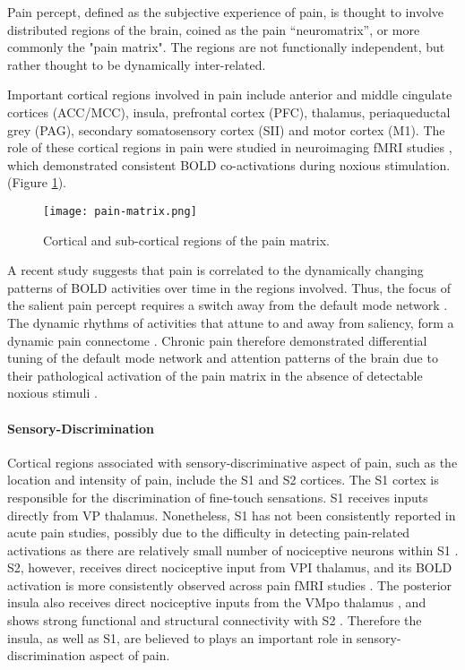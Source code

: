 Pain percept, defined as the subjective experience of pain, is thought to involve distributed regions of the brain, coined as the pain “neuromatrix”\cite{Melzack1999a}, or more commonly the "pain matrix". The regions are not functionally independent, but rather thought to be dynamically inter-related. 

 Important cortical regions involved in pain include anterior and middle cingulate cortices (ACC/MCC), insula, prefrontal cortex (PFC), thalamus, periaqueductal grey (PAG), secondary somatosensory cortex (SII) and motor cortex (M1). The role of these cortical regions in pain were studied in neuroimaging fMRI studies \cite{Apkarian2013c,Wager2013,Davis2012a}, which demonstrated consistent BOLD co-activations during noxious stimulation. (Figure \ref{fig:pain-matrix}).

 \begin{figure}[ht]
 \texttt{[image: pain-matrix.png]}
 \centering
 \caption{ Cortical and sub-cortical regions of the pain matrix. \protect\cite{Tracey2007a}} 
 \label{fig:pain-matrix}
 \end{figure}
 
A recent study suggests that pain is correlated to the dynamically changing patterns of BOLD activities over time in the regions involved. Thus, the focus of the salient pain percept requires a switch away from the default mode network \cite{Kucyi2013}. The dynamic rhythms of activities that attune to and away from saliency, form a dynamic pain connectome \cite{Kucyi2015}. Chronic pain therefore demonstrated differential tuning of the default mode network and attention patterns of the brain due to their pathological activation of the pain matrix in the absence of detectable noxious stimuli \cite{Baliki2008,Legrain2009}.

\paragraph{Sensory-Discrimination}
Cortical regions associated with sensory-discriminative aspect of pain, such as the location and intensity of pain, include the S1 and S2 cortices. The S1 cortex is responsible for the discrimination of fine-touch sensations. S1 receives inputs directly from VP thalamus. Nonetheless, S1 has not been consistently reported in acute pain studies, possibly due to the difficulty in detecting pain-related activations as there are relatively small number of nociceptive neurons within S1 \cite{bushnell1999pain}. S2, however, receives direct nociceptive input from VPI thalamus, and its BOLD activation is more consistently observed across pain fMRI studies \cite{Wager2013,Brodersen2012}. The posterior insula also receives direct nociceptive inputs from the VMpo thalamus \cite{Craig2003}, and shows strong functional and structural connectivity with S2 \cite{Wiech2014}. Therefore the insula, as well as S1, are believed to plays an important role in sensory-discrimination aspect of pain. 


